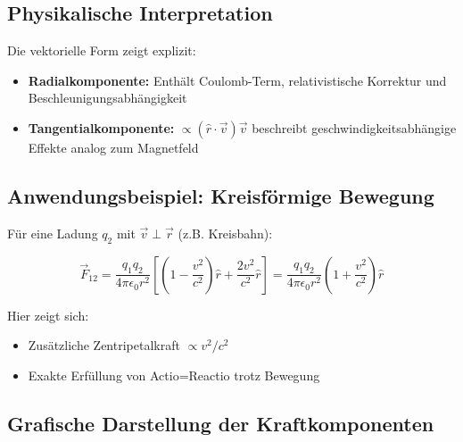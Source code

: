 \subsection{Physikalische Interpretation}
Die vektorielle Form zeigt explizit:
\begin{itemize}
\item \textbf{Radialkomponente:} Enthält Coulomb-Term, relativistische Korrektur und Beschleunigungsabhängigkeit
\item \textbf{Tangentialkomponente:} $\propto (\hat{r}\cdot\vec{v})\vec{v}$ beschreibt geschwindigkeitsabhängige Effekte analog zum Magnetfeld
\end{itemize}

\subsection{Anwendungsbeispiel: Kreisförmige Bewegung}
Für eine Ladung $q_2$ mit $\vec{v} \perp \vec{r}$ (z.B. Kreisbahn):

\begin{equation}
\vec{F}_{12} = \frac{q_1 q_2}{4\pi\epsilon_0 r^2} \left[
\left(1 - \frac{v^2}{c^2}\right)\hat{r} + \frac{2v^2}{c^2}\hat{r}
\right] = \frac{q_1 q_2}{4\pi\epsilon_0 r^2} \left(1 + \frac{v^2}{c^2}\right)\hat{r}
\end{equation}

Hier zeigt sich:
\begin{itemize}
\item Zusätzliche Zentripetalkraft $\propto v^2/c^2$
\item Exakte Erfüllung von Actio=Reactio trotz Bewegung
\end{itemize}

\subsection{Grafische Darstellung der Kraftkomponenten}

